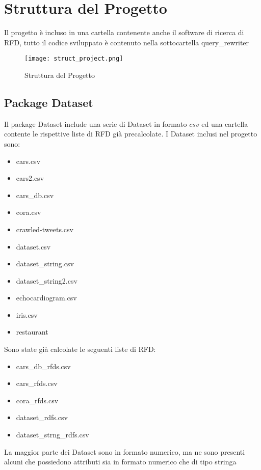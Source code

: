 \section{Struttura del Progetto}
Il progetto è incluso in una cartella contenente anche il software di ricerca di RFD, tutto il codice sviluppato è contenuto nella sottocartella query{\_}rewriter
\begin{figure}[H]
    \centering
    \texttt{[image: struct\_project.png]}
    \caption{Struttura del Progetto}
    \label{fig:struct_project}
\end{figure}

\subsection{Package Dataset}
Il package Dataset include una serie di Dataset in formato $csv$ ed una cartella contente le rispettive liste di RFD già precalcolate. 
I Dataset inclusi nel progetto sono:
\begin{itemize}[noitemsep]
\let\labelitemi\labelitemii
    \item cars.csv
    \item cars2.csv
    \item cars{\_}db.csv
    \item cora.csv
    \item crawled-tweets.csv
    \item dataset.csv
    \item dataset{\_}string.csv
    \item dataset{\_}string2.csv
    \item echocardiogram.csv
    \item iris.csv
    \item restaurant
\end{itemize}

Sono state già calcolate le seguenti liste di RFD:
\begin{itemize}[noitemsep]
\let\labelitemi\labelitemii
    \item cars{\_}db{\_}rfds.csv
    \item cars{\_}rfds.csv
    \item cora{\_}rfds.csv
    \item dataset{\_}rdfs.csv
    \item dataset{\_}strng{\_}rdfs.csv
\end{itemize}


La maggior parte dei Dataset sono in formato numerico, ma ne sono presenti alcuni che possiedono attributi sia in formato numerico che di tipo stringa

